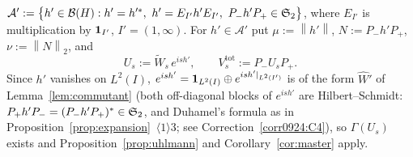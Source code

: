 \documentclass[11pt]{article}
\newcommand{\Pp}{P_+}\newcommand{\Pm}{P_-}
\newcommand{\Wt}{\widetilde W}\newcommand{\kt}{\widetilde k}
\newcommand{\Gm}{\Gamma}
\newcommand{\norm}[1]{\left\lVert #1\right\rVert}\newcommand{\abs}[1]{\left|#1\right|}
\begin{document}
\begin{definition}\label{def:admissible}
$\mathcal A':=\bigl\{h'\in\cB(H):h'=h'^*,\ h'=E_{I'}h'E_{I'},\ \Pm h'\Pp\in\Stwo\bigr\}$, where
$E_{I'}$ is multiplication by $\mathbf 1_{I'}$, $I'=(1,\infty)$.  For $h'\in\mathcal A'$ put
$\mu:=\norm{h'}$, $N:=\Pm h'\Pp$, $\nu:=\norm N_2$, and
\begin{equation}\label{eq:Us}
 U_s:=\Wt_s\,e^{ish'},\qquad V_s^{\mathrm{tot}}:=\Pm U_s\Pp .
\end{equation}
Since $h'$ vanishes on $L^2(I)$, $e^{ish'}=\mathbf 1_{L^2(I)}\oplus e^{ish'|_{L^2(I')}}$ is of the form
$\widehat W'$ of Lemma~\ref{lem:commutant} (both off-diagonal blocks of $e^{ish'}$ are Hilbert--Schmidt: $\Pp h'\Pm=(\Pm h'\Pp)^*\in\Stwo$, and Duhamel's formula as in Proposition~\ref{prop:expansion}~$\langle1\rangle3$; see Correction~\ref{corr0924:C4}), so $\Gm(U_s)$ exists and
Proposition~\ref{prop:uhlmann} and Corollary~\ref{cor:master} apply.
\end{definition}
\end{document}
